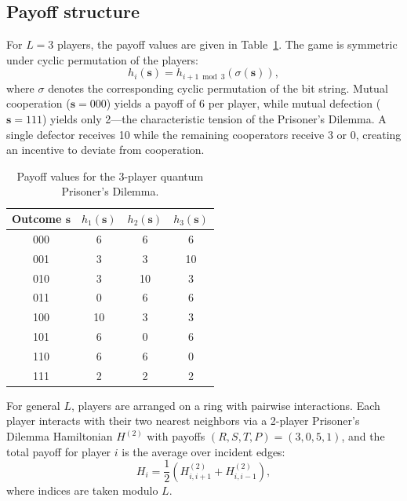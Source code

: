 \documentclass[12pt]{article}
\begin{document}
\subsection{Payoff structure}

For $L = 3$ players, the payoff values are given in Table~\ref{tab:payoffs}.
The game is symmetric under cyclic permutation of the players:
\begin{equation}
    h_i(\mathbf{s}) = h_{i+1 \bmod 3}(\sigma(\mathbf{s})),
\end{equation}
where $\sigma$ denotes the corresponding cyclic permutation of the bit string.
Mutual cooperation ($\mathbf{s} = 000$) yields a payoff of 6 per player,
while mutual defection ($\mathbf{s} = 111$) yields only 2---the characteristic tension of the Prisoner's Dilemma.
A single defector receives 10 while the remaining cooperators receive 3 or 0,
creating an incentive to deviate from cooperation.

\begin{table}[h]
    \centering
    \begin{tabular}{cccc}
        \toprule
        Outcome $\mathbf{s}$ & $h_1(\mathbf{s})$ & $h_2(\mathbf{s})$ & $h_3(\mathbf{s})$ \\
        \midrule
        000 & 6  & 6  & 6  \\
        001 & 3  & 3  & 10 \\
        010 & 3  & 10 & 3  \\
        011 & 0  & 6  & 6  \\
        100 & 10 & 3  & 3  \\
        101 & 6  & 0  & 6  \\
        110 & 6  & 6  & 0  \\
        111 & 2  & 2  & 2  \\
        \bottomrule
    \end{tabular}
    \caption{Payoff values for the 3-player quantum Prisoner's Dilemma.}
    \label{tab:payoffs}
\end{table}

For general $L$, players are arranged on a ring with pairwise interactions.
Each player interacts with their two nearest neighbors via a 2-player Prisoner's Dilemma Hamiltonian
$H^{(2)}$ with payoffs $(R, S, T, P) = (3, 0, 5, 1)$,
and the total payoff for player $i$ is the average over incident edges:
\begin{equation}
    H_i = \frac{1}{2}\left( H^{(2)}_{i, i+1} + H^{(2)}_{i, i-1} \right),
\end{equation}
where indices are taken modulo $L$.
\end{document}

